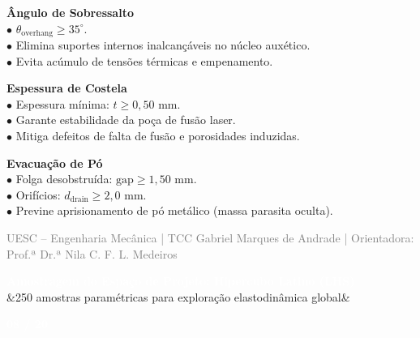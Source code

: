 \documentclass[11pt]{article}
\newcommand{\slideheader}[3]{
    \noindent
    \begin{minipage}{\textwidth}
        \colorbox{SpaceNavy}{
            \parbox{\dimexpr\textwidth-2\fboxsep\relax}{
                \vspace{0.2cm}
                \hspace{0.3cm}
                \begin{minipage}{0.85\textwidth}
                    {\Large \textbf{\textcolor{white}{#1}}}\\[0.1cm]
                    \ifx&#2&\else{\small \textbf{\textcolor{SpaceGold}{#2}}}\fi
                \end{minipage}
                \hfill
                \begin{minipage}{0.10\textwidth}
                    \raggedleft
                    {\large \textbf{\textcolor{white}{#3 / 20}}}\hspace{0.3cm}
                \end{minipage}
                \vspace{0.2cm}
            }
        }
    \end{minipage}
    \vspace{0.4cm}
}
\newcommand{\slidefooter}{
    \vfill
    \noindent
    \begin{minipage}{\textwidth}
        \centering
        \scriptsize \textcolor{gray}{UESC -- Engenharia Mecânica | TCC Gabriel Marques de Andrade | Orientadora: Prof.ª Dr.ª Nila C. F. L. Medeiros}
    \end{minipage}
}
\begin{document}
\begin{minipage}[t]{0.31\textwidth}
    \textbf{\textcolor{NavyAccent}{Ângulo de Sobressalto}}\\[0.2cm]
    \small
    $\bullet$ $\theta_{\text{overhang}} \ge 35^\circ$.\\
    $\bullet$ Elimina suportes internos inalcançáveis no núcleo auxético.\\
    $\bullet$ Evita acúmulo de tensões térmicas e empenamento.
\end{minipage}
\hfill
\begin{minipage}[t]{0.31\textwidth}
    \textbf{\textcolor{NavyAccent}{Espessura de Costela}}\\[0.2cm]
    \small
    $\bullet$ Espessura mínima: $t \ge 0{,}50\text{ mm}$.\\
    $\bullet$ Garante estabilidade da poça de fusão laser.\\
    $\bullet$ Mitiga defeitos de falta de fusão e porosidades induzidas.
\end{minipage}
\hfill
\begin{minipage}[t]{0.31\textwidth}
    \textbf{\textcolor{NavyAccent}{Evacuação de Pó}}\\[0.2cm]
    \small
    $\bullet$ Folga desobstruída: $\text{gap} \ge 1{,}50\text{ mm}$.\\
    $\bullet$ Orifícios: $d_{\text{drain}} \ge 2{,}0\text{ mm}$.\\
    $\bullet$ Previne aprisionamento de pó metálico (massa parasita oculta).
\end{minipage}

\slidefooter
\clearpage

\slideheader{Amostragem do Espaço de Projeto: Hipercubo Latino (LHS)}{250 amostras paramétricas para exploração elastodinâmica global}{08}
\end{document}
